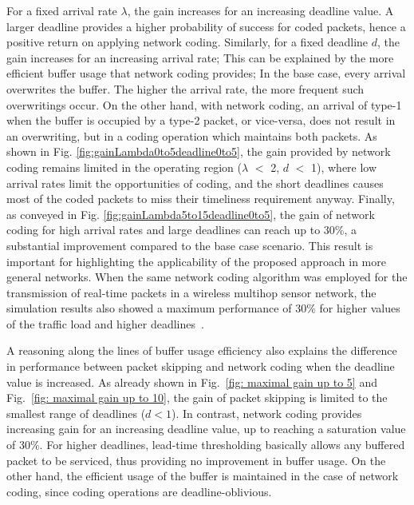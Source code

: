 \documentclass[preprint,12pt]{elsarticle}
\theoremstyle{definition}
\theoremstyle{plain}
\theoremstyle{remark}
\begin{document}
For a fixed arrival rate $\lambda$, the gain increases for an increasing deadline value. A larger deadline provides a higher probability of success for coded packets, hence a positive return on applying network coding. Similarly, for a fixed deadline $d$, the gain increases for an increasing arrival rate; This can be explained by the more efficient buffer usage that network coding provides; In the base case, every arrival overwrites the buffer. The higher the arrival rate, the more frequent such overwritings occur. On the other hand, with network coding, an arrival of type-1 when the buffer is occupied by a type-2 packet, or vice-versa, does not result in an overwriting, but in a coding operation which maintains both packets.
As shown in Fig. \ref{fig:gainLambda0to5deadline0to5}, the gain provided by network coding remains limited in the operating region ($\lambda$ $<$ 2, $d$ $<$ 1), where low arrival rates limit the opportunities of coding, and the short deadlines causes most of the coded packets to miss their timeliness requirement anyway.
Finally, as conveyed in Fig. \ref{fig:gainLambda5to15deadline0to5}, the gain of network coding for high arrival rates and large deadlines can reach up to 30\%, a substantial improvement compared to the base case scenario. This result is important for highlighting the applicability of the proposed approach in more general networks. When the same network coding algorithm was employed for the transmission of real-time packets in a wireless multihop sensor network, the simulation results also showed a maximum performance of 30\% for higher values of the traffic load and higher deadlines~\cite{aoun-ewsn2011}.

A reasoning along the lines of buffer usage efficiency also explains the difference in performance between packet skipping and network coding when the deadline value is increased. As already shown in Fig.~\ref{fig: maximal gain up to 5} and Fig.~\ref{fig: maximal gain up to 10}, the gain of packet skipping is limited to the smallest range of deadlines ($d<1$). In contrast, network coding provides increasing gain for an increasing deadline value, up to reaching a saturation value of 30\%. For higher deadlines, lead-time thresholding basically allows any buffered packet to be serviced, thus providing no improvement in buffer usage. On the other hand, the efficient usage of the buffer is maintained in the case of network coding, since coding operations are deadline-oblivious.
\end{document}

